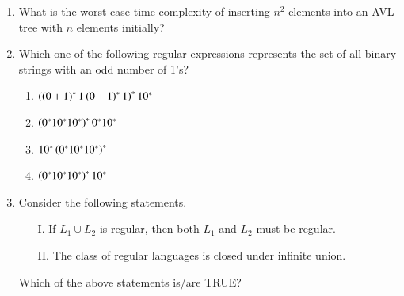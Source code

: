 \documentclass[journal,12pt,onecolumn]{IEEEtran}
\theoremstyle{remark}
\begin{document}
\begin{enumerate}
	\item What is the worst case time complexity of inserting $n^2$ elements into an AVL-tree with $n$ elements initially?
	
	\hfill{}
	\begin{enumerate}
	\end{enumerate}
	
	\item Which one of the following regular expressions represents the set of all binary strings with an odd number of 1’s?
	
	\hfill{\brak{\text{GATE CS 2020}}}
	\begin{enumerate}
		\item $\left(\left(0+1\right)^*1\left(0+1\right)^*1\right)^*10^*$
		\item $\left(0^*10^*10^*\right)^*0^*10^*$
		\item $10^*\left(0^*10^*10^*\right)^*$
		\item $\left(0^*10^*10^*\right)^*10^*$
	\end{enumerate}
	
	\item Consider the following statements.
	\begin{enumerate}
		\item[I.] If $L_1 \cup L_2$ is regular, then both $L_1$ and $L_2$ must be regular.
		\item[II.] The class of regular languages is closed under infinite union.
	\end{enumerate}
	Which of the above statements is/are TRUE?
	\hfill{}
	\begin{enumerate}
	\end{enumerate}
	

\end{enumerate}
\end{document}
